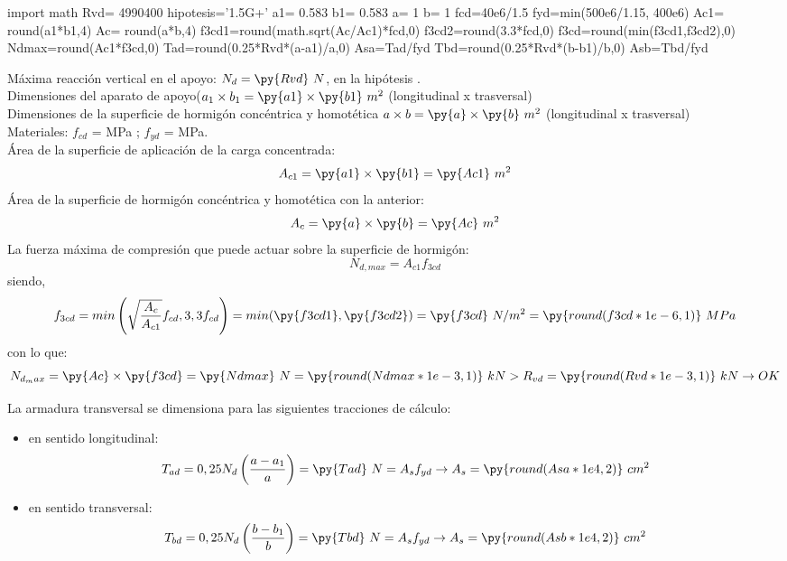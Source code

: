 \documentclass[spanish, twoside, a4paper,11pt]{article}
\begin{document}
\begin{pycode}
import math
Rvd= 4990400
hipotesis='1.5G+'
a1= 0.583
b1= 0.583 
a= 1
b= 1
fcd=40e6/1.5
fyd=min(500e6/1.15, 400e6)
Ac1= round(a1*b1,4)
Ac= round(a*b,4)
f3cd1=round(math.sqrt(Ac/Ac1)*fcd,0)
f3cd2=round(3.3*fcd,0)
f3cd=round(min(f3cd1,f3cd2),0)
Ndmax=round(Ac1*f3cd,0)
Tad=round(0.25*Rvd*(a-a1)/a,0)
Asa=Tad/fyd 
Tbd=round(0.25*Rvd*(b-b1)/b,0)
Asb=Tbd/fyd 
\end{pycode}

Máxima reacción vertical en el apoyo: $N_d = \py{Rvd} \ N$, en la hipótesis . \\

Dimensiones del aparato de apoyo($a_1 \times b_1 =  \py{a1} \times \py{b1}\ m^2$  (longitudinal x trasversal) \\

Dimensiones de la superficie de hormigón concéntrica y homotética $a \times b = \py{a} \times \py{b}\ m^2$ (longitudinal x trasversal) \\

Materiales: $f_{cd}$ =  MPa ; $f_{yd}$ =  MPa. \\

Área de la superficie de aplicación de la carga concentrada:
$$A_{c1} = \py{a1} \times \py{b1} = \py{Ac1} \ m^2$$
Área de la superficie de hormigón concéntrica y homotética con la anterior:
$$A_c = \py{a} \times \py{b} = \py{Ac} \ m^2$$
La fuerza máxima de compresión que puede actuar sobre la superficie de hormigón:
$$N_{d,max} = A_{c1} f_{3cd}$$
siendo,
$$f_{3cd} = min\left(\sqrt{\frac{A_c}{A_{c1}}}f_{cd}, 3,3 f_{cd}\right) = min(\py{f3cd1},\py{f3cd2}) = \py{f3cd}\ N/m^2 = \py{round(f3cd*1e-6,1)}\ MPa $$
con lo que:
$$N_{d_max} = \py{Ac} \times \py{f3cd} = \py{Ndmax} \ N = \py{round(Ndmax*1e-3,1)} \ kN > R_{vd} = \py{round(Rvd*1e-3,1)} \ kN \rightarrow OK$$


La armadura transversal se dimensiona para las siguientes tracciones de cálculo:
\begin{itemize}
\item en sentido longitudinal:
  $$T_{ad} = 0,25 N_d \left(\frac{a - a_1}{a} \right) = \py{Tad}\ N = A_sf_{yd} \rightarrow A_s = \py{round(Asa*1e4,2)}\ cm^2$$  
\item en sentido transversal:
  $$T_{bd} = 0,25 N_d \left(\frac{b - b_1}{b} \right) = \py{Tbd}\ N = A_sf_{yd} \rightarrow A_s = \py{round(Asb*1e4,2)}\ cm^2$$  
\end{itemize}
\end{document}
